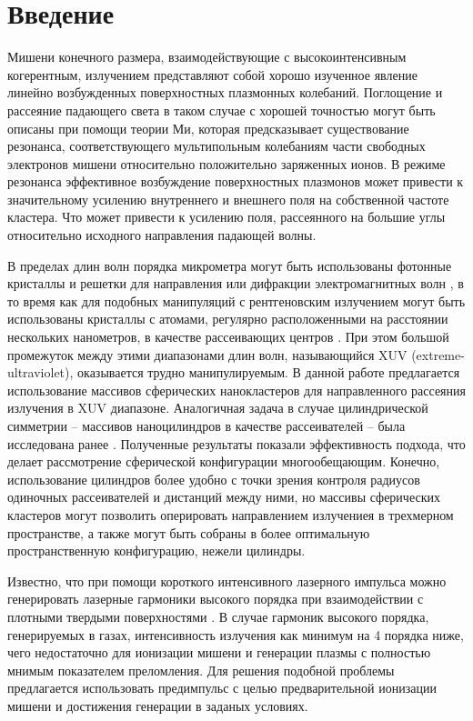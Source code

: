 \section{Введение}

Мишени конечного размера, взаимодействующие с высокоинтенсивным когерентным, излучением представляют собой хорошо изученное явление линейно возбужденных 
поверхностных плазмонных колебаний. Поглощение и рассеяние падающего света в таком случае с хорошей точностью могут быть описаны при помощи теории Ми, которая предсказывает существование резонанса, соответствующего мультипольным колебаниям части свободных электронов мишени относительно положительно заряженных ионов. В режиме резонанса эффективное возбуждение поверхностных плазмонов может привести к значительному усилению внутреннего и внешнего 
поля на собственной частоте кластера. Что может привести к усилению поля, рассеянного на большие углы относительно исходного направления падающей волны.

В пределах длин волн порядка микрометра могут быть использованы фотонные кристаллы и решетки для направления или дифракции электромагнитных волн \cite{lin_zhang}, в то время как для подобных манипуляций с рентгеновским излучением могут быть использованы кристаллы с атомами, регулярно расположенными на расстоянии нескольких нанометров, в качестве рассеивающих центров \cite{batterman_cole}. При этом большой промежуток между этими диапазонами длин волн, называющийся XUV (extreme-ultraviolet), оказывается трудно манипулируемым. В данной работе предлагается использование массивов сферических нанокластеров для направленного рассеяния излучения в XUV диапазоне. Аналогичная задача в случае цилиндрической симметрии -- массивов наноцилиндров в качестве рассеивателей -- была исследована ранее \cite{andreev_lecz}. Полученные результаты показали эффективность подхода, что делает рассмотрение сферической конфигурации многообещающим. Конечно, использование цилиндров более удобно с точки зрения контроля радиусов одиночных рассеивателей и дистанций между ними, но массивы сферических кластеров могут позволить оперировать направлением излучениея в трехмерном пространстве, а также могут быть собраны в более оптимальную пространственную конфигурацию, нежели цилиндры.

Известно, что при помощи короткого интенсивного лазерного импульса можно генерировать лазерные гармоники высокого порядка при взаимодействии с плотными твердыми поверхностями \cite{teubner_gibbon_hoh}. В случае гармоник высокого порядка, генерируемых в газах, интенсивность излучения как минимум на 4 порядка ниже, чего недостаточно для ионизации мишени и генерации плазмы с полностью мнимым показателем преломления. Для решения подобной проблемы предлагается использовать предимпульс с целью предварительной ионизации мишени и достижения генерации в заданых условиях. 


